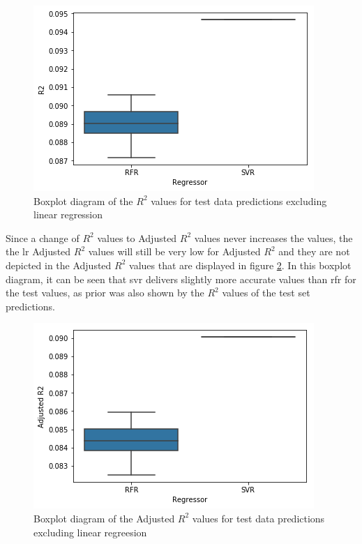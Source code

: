\documentclass[a4paper, 11pt, oneside]{Thesis}  %
\begin{document}
\begin{figure}[h]
\includegraphics[scale=0.7]{Figures/Regressor_comparison/boxplot_r2_test_data_without_lr.png}
\centering
\caption{Boxplot diagram of the $R^2$ values for test data predictions excluding linear regression}
\label{fig:boxplot_r2_test_data_without_lr}
\end{figure}

Since a change of $R^2$ values to Adjusted $R^2$ values never increases the values, the the \ac{lr} Adjusted $R^2$ values will still be very low for Adjusted $R^2$ and they are not depicted in the Adjusted $R^2$ values that are displayed in figure \ref{fig:boxplot_adj_r2_test_data_without_lr}. In this boxplot diagram, it can be seen that \ac{svr} delivers slightly more accurate values than \ac{rfr} for the test values, as prior was also shown by the $R^2$ values of the test set predictions.

\begin{figure}[h]
\includegraphics[scale=0.7]{Figures/Regressor_comparison/boxplot_adj_r2_test_data_without_lr.png}
\centering
\caption{Boxplot diagram of the Adjusted $R^2$ values for test data predictions excluding linear regreesion}
\label{fig:boxplot_adj_r2_test_data_without_lr}
\end{figure}
\end{document}
